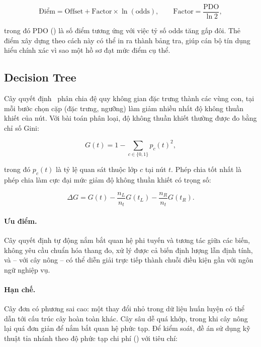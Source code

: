 \begin{equation}
\text{Điểm} = \text{Offset} + \text{Factor} \times \ln(\text{odds}),
\qquad
\text{Factor} = \frac{\text{PDO}}{\ln 2},
\label{eq:scorecard}
\end{equation}

trong đó PDO () là số điểm tương ứng với việc tỷ
số odds tăng gấp đôi. Thẻ điểm xây dựng theo cách này có thể in ra thành bảng
tra, giúp cán bộ tín dụng hiểu chính xác vì sao một hồ sơ đạt mức điểm cụ thể.

\subsection{Decision Tree}
\label{subsec:decision-tree}

Cây quyết định~\cite{breiman1984} phân chia đệ quy không gian đặc trưng thành các
vùng con, tại mỗi
bước chọn cặp (đặc trưng, ngưỡng) làm giảm nhiều nhất độ không thuần khiết của
nút. Với bài toán phân loại, độ không thuần khiết thường được đo bằng chỉ số
Gini:

\begin{equation}
G(t) = 1 - \sum_{c \in \{0,1\}} p_c(t)^2,
\label{eq:gini-impurity}
\end{equation}

trong đó $p_c(t)$ là tỷ lệ quan sát thuộc lớp $c$ tại nút $t$. Phép chia tốt nhất
là phép chia làm cực đại mức giảm độ không thuần khiết có trọng số:

\begin{equation}
\Delta G = G(t) - \frac{n_L}{n_t} G(t_L) - \frac{n_R}{n_t} G(t_R).
\label{eq:gini-gain}
\end{equation}

\paragraph{Ưu điểm.} Cây quyết định tự động nắm bắt quan hệ phi tuyến và tương
tác giữa các biến, không yêu cầu chuẩn hóa thang đo, xử lý được cả biến định
lượng lẫn định tính, và -- với cây nông -- có thể diễn giải trực tiếp thành chuỗi
điều kiện gần với ngôn ngữ nghiệp vụ.

\paragraph{Hạn chế.} Cây đơn có phương sai cao: một thay đổi nhỏ trong dữ liệu
huấn luyện có thể dẫn tới cấu trúc cây hoàn toàn khác. Cây sâu dễ quá khớp, trong
khi cây nông lại quá đơn giản để nắm bắt quan hệ phức tạp. Để kiểm soát, đề án sử
dụng kỹ thuật tỉa nhánh theo độ phức tạp chi phí ()
với tiêu chí:

